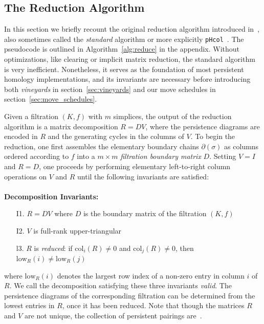 \documentclass[sn-mathphys]{sn-jnl}
\begin{document}
\subsection{The Reduction Algorithm}\label{sec:reduction}
In this section we briefly recount the original reduction algorithm introduced in~\cite{zomorodian2005computing}, also sometimes called the \emph{standard} algorithm or more explicitly \texttt{pHcol}~\cite{de2011dualities}. 
The pseudocode is outlined in Algorithm~\ref{alg:reduce} in the appendix. Without optimizations, like   clearing   or implicit matrix reduction, the standard  algorithm is very inefficient. Nonetheless, it serves as the foundation of most persistent homology implementations, and its invariants are necessary before introducing both \emph{vineyards} in section~\ref{sec:vineyards} and our move schedules in section~\ref{sec:move_schedules}.


 Given a filtration $(K, f)$ with $m$ simplices,  the output of the reduction algorithm is a matrix decomposition $R = D V$, where the persistence diagrams are encoded in $R$ and the generating cycles in the columns of $V$.
 To begin the reduction, one first  assembles the elementary boundary chains $\partial(\sigma)$ as columns ordered according to $f$ into a $m \times m$  \emph{filtration boundary matrix} $D$. Setting $V = I$ and $R = D$, one proceeds by performing elementary left-to-right column operations on $V$ and $R$ until the following invariants are satisfied:
\\
\\
\textbf{ Decomposition Invariants:}
 \begin{enumerate}[labelsep=3pt, topsep=2pt,itemsep=-0.25ex,parsep=1.0ex]\label{inv:decomposition}
 	\item[I1.] $R = D V$ where $D$ is the boundary matrix of the filtration $(K,f)$
 	\item[I2.] $V$ is full-rank upper-triangular
 	\item[l3.] $R$ is \emph{reduced}: if $\mathrm{col}_i(R) \neq 0$ and $\mathrm{col}_j(R) \neq 0$, then $\mathrm{low}_R(i) \neq \mathrm{low}_R(j)$ 
 	\end{enumerate} 
 \vspace*{1em}
 where $\mathrm{low}_R(i)$ denotes the largest row index of a non-zero entry in column $i$ of $R$. 
We call the decomposition satisfying these three invariants \emph{valid}. The persistence diagrams of the corresponding filtration  can be determined from the lowest entries in $R$, once it has been reduced. Note that though the matrices $R$ and $V$ are not unique, the collection of persistent pairings are~\cite{zomorodian2005computing}.
 
\end{document}
